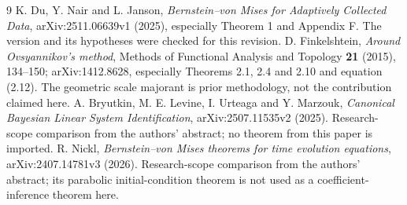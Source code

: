 \begin{thebibliography}{9}
 K. Du, Y. Nair and L. Janson, \emph{Bernstein--von Mises for Adaptively Collected Data}, arXiv:2511.06639v1 (2025), especially Theorem 1 and Appendix F. The version and its hypotheses were checked for this revision.
 D. Finkelshtein, \emph{Around Ovsyannikov's method}, Methods of Functional Analysis and Topology \textbf{21} (2015), 134--150; arXiv:1412.8628, especially Theorems 2.1, 2.4 and 2.10 and equation (2.12). The geometric scale majorant is prior methodology, not the contribution claimed here.
 A. Bryutkin, M. E. Levine, I. Urteaga and Y. Marzouk, \emph{Canonical Bayesian Linear System Identification}, arXiv:2507.11535v2 (2025). Research-scope comparison from the authors' abstract; no theorem from this paper is imported.
 R. Nickl, \emph{Bernstein--von Mises theorems for time evolution equations}, arXiv:2407.14781v3 (2026). Research-scope comparison from the authors' abstract; its parabolic initial-condition theorem is not used as a coefficient-inference theorem here.
\end{thebibliography}
